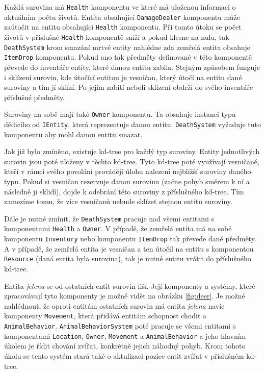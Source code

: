 Každá surovina má \texttt{Health} komponentu ve které má uloženou informaci o aktuálním počtu životů. Entita obsahující \texttt{DamageDealer} komponentu může zaútočit na entitu obsahující \texttt{Health} komponentu. Při tomto útoku se počet životů v příslušné \texttt{Health} komponentě sníží a pokud klesne na nulu, tak \texttt{DeathSystem} krom smazání mrtvé entity nahlédne zda zemřelá entita obsahuje \texttt{ItemDrop} komponentu. Pokud ano tak předměty definované v této komponentě převede do inventáře entity, které danou entitu zabila. Stejným způsobem funguje i sklízení surovin, kde útočící entitou je vesničan, který útočí na entitu dané suroviny a tím jí sklízí. Po jejím zabití neboli sklizení obdrží do svého inventáře příslušné předměty.

Suroviny na sobě mají také \texttt{Owner} komponentu. Ta obsahuje instanci typu dědicího od \texttt{IEntity}, která reprezentuje danou entitu. \texttt{DeathSystem} vyžaduje tuto komponentu aby mohl danou entitu smazat.

Jak již bylo zmíněno, existuje kd-tree pro každý typ suroviny. Entity jednotlivých surovin jsou poté uloženy v těchto kd-tree. Tyto kd-tree poté využívají vesničané, kteří v rámci svého povolání provádějí úlohu nalezení nejbližší suroviny daného typu. Pokud si vesničan rezervuje danou surovinu (začne pohyb směrem k ní a následně ji sklidí), dojde k odebrání této suroviny z příslušného kd-tree. Tím zamezíme tomu, že více vesničanů nebude sklízet stejnou entitu suroviny.

Dále je nutné zmínit, že \texttt{DeathSystem} pracuje nad všemi entitami s komponentami \texttt{Health} a \texttt{Owner}. V případě, že zemřelá entita má na sobě komponentu \texttt{Inventory} nebo komponentu \texttt{ItemDrop} tak převede dané předměty. A v případě, že zemřelá entita je vesničan a ten útočil na entitu s komponentou \texttt{Resource} (daná entita byla surovina), tak je nutné entitu vrátit do příslušného kd-tree.

Entita \textit{jelena} se od ostatních entit surovin liší. Její komponenty a systémy, které zpracovávají tyto komponenty je možné vidět na obrázku \ref{fig:deer}. Je možné nahlédnout, že oproti entitám ostatních surovin má entita \textit{jelena} navíc komponenty \texttt{Movement}, která přidává entitám schopnost chodit a \texttt{AnimalBehavior}. \texttt{AnimalBehaviorSystem} poté pracuje se všemi entitami s komponentami \texttt{Location}, \texttt{Owner}, \texttt{Movement} a \texttt{AnimalBehavior} a jeho hlavním úkolem je řídit chování zvířat, konkrétně jejich náhodný pohyb. Krom tohoto úkolu se tento systém stará také o aktulizaci pozice entit zvířat v příslušném kd-tree.

